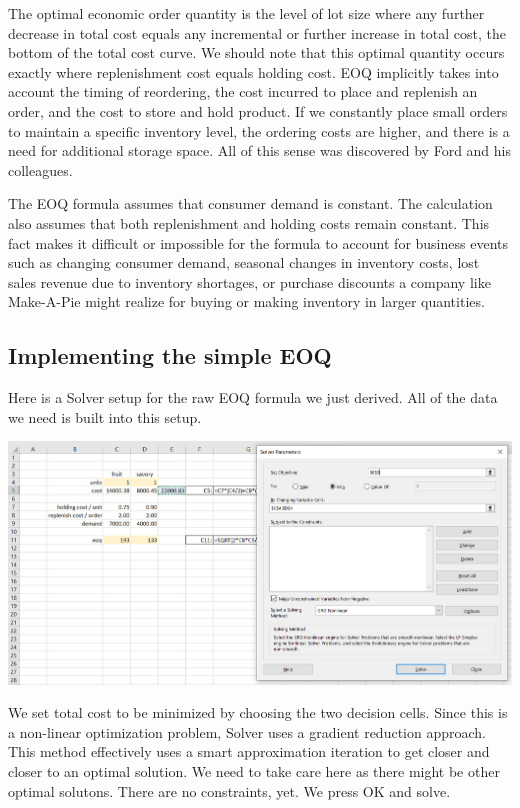 \documentclass[
]{book}
\begin{document}
The optimal economic order quantity is the level of lot size where any further decrease in total cost equals any incremental or further increase in total cost, the bottom of the total cost curve. We should note that this optimal quantity occurs exactly where replenishment cost equals holding cost. EOQ implicitly takes into account the timing of reordering, the cost incurred to place and replenish an order, and the cost to store and hold product. If we constantly place small orders to maintain a specific inventory level, the ordering costs are higher, and there is a need for additional storage space. All of this sense was discovered by Ford and his colleagues.

The EOQ formula assumes that consumer demand is constant. The calculation also assumes that both replenishment and holding costs remain constant. This fact makes it difficult or impossible for the formula to account for business events such as changing consumer demand, seasonal changes in inventory costs, lost sales revenue due to inventory shortages, or purchase discounts a company like Make-A-Pie might realize for buying or making inventory in larger quantities.

\hypertarget{implementing-the-simple-eoq}{%
\subsection{Implementing the simple EOQ}\label{implementing-the-simple-eoq}}

Here is a Solver setup for the raw EOQ formula we just derived. All of the data we need is built into this setup.

\includegraphics{images/04/eoq-simple-solver-setup.jpg}

We set total cost to be minimized by choosing the two decision cells. Since this is a non-linear optimization problem, Solver uses a gradient reduction approach. This method effectively uses a smart approximation iteration to get closer and closer to an optimal solution. We need to take care here as there might be other optimal solutons. There are no constraints, yet. We press OK and solve.
\end{document}
